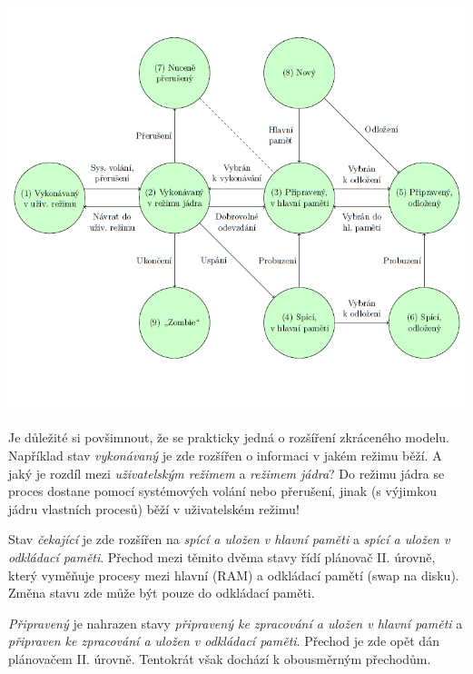 \begin{center}
    \includegraphics[scale=0.9]{images/proc_extended_states.png}
\end{center}

Je důležité si povšimnout, že se prakticky jedná o rozšíření zkráceného modelu. Například stav \textit{vykonávaný} je zde rozšířen o informaci v jakém režimu běží. A jaký je rozdíl mezi \textit{uživatelským režimem} a \textit{režimem jádra}? Do režimu jádra se proces dostane pomocí systémových volání nebo přerušení, jinak (s výjimkou jádru vlastních procesů) běží v uživatelském režimu!

\vspace{0,5cm}

Stav \textit{čekající} je zde rozšířen na \textit{spící a uložen v hlavní paměti} a \textit{spící a uložen v odkládací paměti}. Přechod mezi těmito dvěma stavy řídí plánovač II. úrovně, který vyměňuje procesy mezi hlavní (RAM) a odkládací pamětí (swap na disku). Změna stavu zde může být pouze do odkládací paměti. 

\vspace{0,5cm}

\textit{Připravený} je nahrazen stavy \textit{připravený ke zpracování a uložen v hlavní paměti} a \textit{připraven ke zpracování a uložen v odkládací paměti}. Přechod je zde opět dán plánovačem II. úrovně. Tentokrát však dochází k obousměrným přechodům. 

\vspace{0,5cm}

